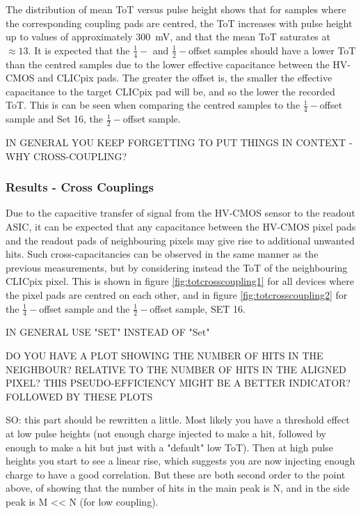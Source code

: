 The distribution of mean ToT versus pulse height shows that for samples where the corresponding coupling pads are centred, the ToT increases with pulse height up to values of approximately 300~mV, and that the mean ToT saturates at $\approx 13$.  It is expected that the $\frac{1}{4}-$ and $\frac{1}{2}-$offset samples should have a lower ToT than the centred samples due to the lower effective capacitance between the HV-CMOS and CLICpix pads.  The greater the offset is, the smaller the effective capacitance to the target CLICpix pad will be, and so the lower the recorded ToT.  This is can be seen when comparing the centred samples to the $\frac{1}{4}-$offset sample and Set 16, the $\frac{1}{2}-$offset sample.  

IN GENERAL YOU KEEP FORGETTING TO PUT THINGS IN CONTEXT - WHY CROSS-COUPLING?

\subsubsection{Results -  Cross Couplings}

Due to the capacitive transfer of signal from the HV-CMOS sensor to the readout ASIC, it can be expected that any capacitance between the HV-CMOS pixel pads and the readout pads of neighbouring pixels may give rise to additional unwanted hits. Such cross-capacitancies can be observed in the same manner as the previous measurements, but by considering instead the ToT of the neighbouring CLICpix pixel. This is shown in figure \ref{fig:totcrosscoupling1} for all devices where the pixel pads are centred on each other, and in figure \ref{fig:totcrosscoupling2} for the $\frac{1}{4}-$offset sample and the $\frac{1}{2}-$offset sample, SET 16.  

IN GENERAL USE "SET" INSTEAD OF "Set"

DO YOU HAVE A PLOT SHOWING THE NUMBER OF HITS IN THE NEIGHBOUR? RELATIVE TO THE NUMBER OF HITS IN THE ALIGNED PIXEL? THIS PSEUDO-EFFICIENCY MIGHT BE A BETTER INDICATOR? FOLLOWED BY THESE PLOTS

SO: this part should be rewritten a little. Most likely you have a threshold effect at low pulse heights (not enough charge injected to make a hit, followed by enough to make a hit but just with a "default" low ToT). Then at high pulse heights you start to see a linear rise, which suggests you are now injecting enough charge to have a good correlation. But these are both second order to the point above, of showing that the number of hits in the main peak is N, and in the side peak is M << N (for low coupling).

